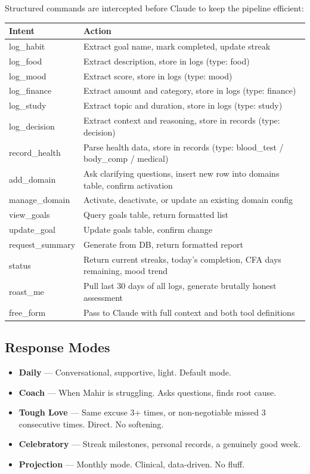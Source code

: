 \documentclass[12pt, a4paper]{article}
\begin{document}
Structured commands are intercepted before Claude to keep the pipeline efficient:

\begin{longtable}{>{\ttfamily}p{4cm} p{10cm}}
\toprule
Intent & Action \\
\midrule
log\_habit & Extract goal name, mark completed, update streak \\
log\_food & Extract description, store in logs (type: food) \\
log\_mood & Extract score, store in logs (type: mood) \\
log\_finance & Extract amount and category, store in logs (type: finance) \\
log\_study & Extract topic and duration, store in logs (type: study) \\
log\_decision & Extract context and reasoning, store in records (type: decision) \\
record\_health & Parse health data, store in records (type: blood\_test / body\_comp / medical) \\
add\_domain & Ask clarifying questions, insert new row into domains table, confirm activation \\
manage\_domain & Activate, deactivate, or update an existing domain config \\
view\_goals & Query goals table, return formatted list \\
update\_goal & Update goals table, confirm change \\
request\_summary & Generate from DB, return formatted report \\
status & Return current streaks, today's completion, CFA days remaining, mood trend \\
roast\_me & Pull last 30 days of all logs, generate brutally honest assessment \\
free\_form & Pass to Claude with full context and both tool definitions \\
\bottomrule
\end{longtable}

\subsection{Response Modes}

\begin{itemize}[noitemsep]
    \item \textbf{Daily} --- Conversational, supportive, light. Default mode.
    \item \textbf{Coach} --- When Mahir is struggling. Asks questions, finds root cause.
    \item \textbf{Tough Love} --- Same excuse 3+ times, or non-negotiable missed 3 consecutive times. Direct. No softening.
    \item \textbf{Celebratory} --- Streak milestones, personal records, a genuinely good week.
    \item \textbf{Projection} --- Monthly mode. Clinical, data-driven. No fluff.
\end{itemize}
\end{document}

